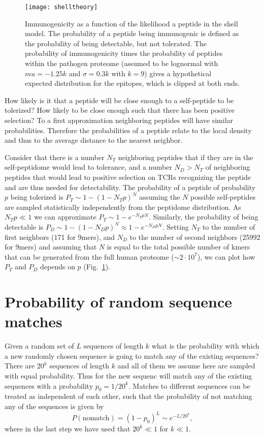 \documentclass[superscriptaddress,twocolumn,pre]{revtex4}
\newcommand{\<}{\langle}
\renewcommand{\>}{\rangle}
\begin{document}
\begin{figure}
    \texttt{[image: shelltheory]}
    \caption{Immunogenicity as a function of the likelihood a peptide in the shell model. The probability of a peptide being immunogenic is defined as the probability of being detectable, but not tolerated. The probability of immunogenicity times the probability of peptides within the pathogen proteome (assumed to be lognormal with $mu = -1.25 k$ and $\sigma = 0.3 k$ with $k=9$) gives a hypothetical expected distribution for the epitopes, which is clipped at both ends.  
    \label{figshelltheory}
    }
\end{figure}

How likely is it that a peptide will be close enough to a self-peptide to be tolerized? How likely to be close enough such that there has been positive selection? To a first approximation neighboring peptides will have similar probabilities. Therefore the probabilities of a peptide relate to the local density and thus to the average distance to the nearest neighbor.

Consider that there is a number $N_T$ neighboring peptides that if they are in the self-peptidome would lead to tolerance, and a number $N_D > N_T$ of neighboring peptides that would lead to positive selection on TCRs recognizing the peptide and are thus needed for detectability. The probability of a peptide of probability $p$ being tolerized is $P_T \sim 1-(1-N_T p)^N$ assuming the $N$ possible self-peptides are sampled statistically independently from the peptidome distribution. As $N_T p \ll 1$ we can approximate $P_T \sim 1-e^{-N_T p N}$. Similarly, the probability of being detectable is $P_D \sim 1-(1-N_D p)^N \approx 1-e^{-N_D p N}$. Setting $N_T$ to the number of first neighbors (171 for 9mers), and $N_D$ to the number of second neighbors (25992 for 9mers) and assuming that $N$ is equal to the total possible number of kmers that can be generated from the full human proteome ($\sim 2 \cdot 10^7$), we can plot how $P_T$ and $P_D$ depends on $p$ (Fig.~\ref{figshelltheory}).



\section{Probability of random sequence matches}
 \label{secsequencematching}
Given a random set of $L$ sequences of length $k$ what is the probability with which a new randomly chosen sequence is going to match any of the existing sequences?
There are $20^k$ sequences of length $k$ and all of them we assume here are sampled with equal probability. Thus for the new sequenc will match any of the existing sequences with a probability $p_0 = 1/20^k$. Matches to different sequences can be treated as independent of each other, such that the probability of not matching any of the sequences is given by
\begin{equation}
    P(\mathrm{no match}) = (1-p_0)^L \sim e^{-L / 20^k},
\end{equation}
where in the last step we have used that $20^k \ll 1$ for $k \ll 1$.
\end{document}
